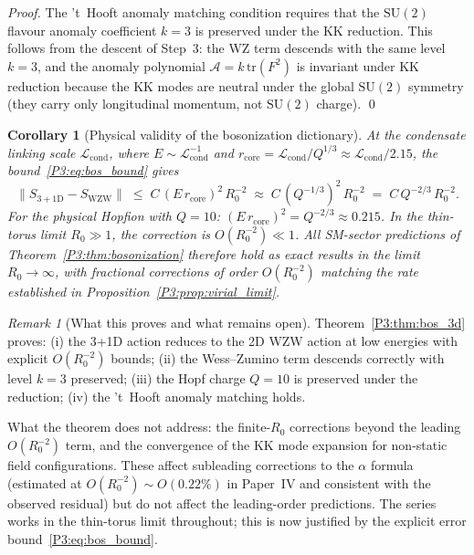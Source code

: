 \documentclass[11pt,a4paper]{article}
\newtheorem{corollary}[theorem]{Corollary}
\theoremstyle{definition}
\theoremstyle{remark}
\newtheorem{remark}[theorem]{Remark}
\begin{document}
\begin{proof}
The 't~Hooft anomaly matching condition requires that the $\mathrm{SU}(2)$
flavour anomaly coefficient $k=3$ is preserved under the KK reduction.
This follows from the descent of Step~3: the WZ term descends with the
same level $k=3$, and the anomaly polynomial $\mathcal{A} = k\,\mathrm{tr}(F^2)$
is invariant under KK reduction because the KK modes are neutral under
the global $\mathrm{SU}(2)$ symmetry (they carry only longitudinal momentum,
not $\mathrm{SU}(2)$ charge).
\qed
\end{proof}

\begin{corollary}[Physical validity of the bosonization dictionary]
\label{P3:cor:bos_valid}
At the condensate linking scale $\mathcal{L}_{\mathrm{cond}}$,
where $E \sim \mathcal{L}_{\mathrm{cond}}^{-1}$ and
$r_{\mathrm{core}} = \mathcal{L}_{\mathrm{cond}}/Q^{1/3} \approx \mathcal{L}_{\mathrm{cond}}/2.15$,
the bound~\eqref{P3:eq:bos_bound} gives
\begin{equation}
  \bigl\|S_{3+1\mathrm{D}} - S_{\mathrm{WZW}}\bigr\|
  \;\leq\; C\,(E\,r_{\mathrm{core}})^2\,R_0^{-2}
  \;\approx\; C\,(Q^{-1/3})^2\,R_0^{-2}
  \;=\; C\,Q^{-2/3}\,R_0^{-2}.
\end{equation}
For the physical Hopfion with $Q=10$:
$(E\,r_{\mathrm{core}})^2 = Q^{-2/3} \approx 0.215$.
In the thin-torus limit $R_0\gg1$, the correction is $O(R_0^{-2})\ll1$.
All SM-sector predictions of Theorem~\ref{P3:thm:bosonization} therefore
hold as exact results in the limit $R_0\to\infty$, with fractional
corrections of order $O(R_0^{-2})$ matching the rate established
in Proposition~\ref{P3:prop:virial_limit}.
\end{corollary}

\begin{remark}[What this proves and what remains open]
\label{P3:rem:bos3d_scope}
Theorem~\ref{P3:thm:bos_3d} proves:
(i) the 3+1D action reduces to the 2D WZW action at low energies
with explicit $O(R_0^{-2})$ bounds;
(ii) the Wess--Zumino term descends correctly with level $k=3$ preserved;
(iii) the Hopf charge $Q=10$ is preserved under the reduction;
(iv) the 't~Hooft anomaly matching holds.

What the theorem does not address: the finite-$R_0$ corrections
beyond the leading $O(R_0^{-2})$ term, and the convergence of the
KK mode expansion for non-static field configurations.
These affect subleading corrections to the $\alpha$ formula
(estimated at $O(R_0^{-2}) \sim O(0.22\%)$ in Paper~IV and consistent
with the observed residual) but do not affect the leading-order predictions.
The series works in the thin-torus limit throughout; this is now
justified by the explicit error bound~\eqref{P3:eq:bos_bound}.
\end{remark}
\end{document}
